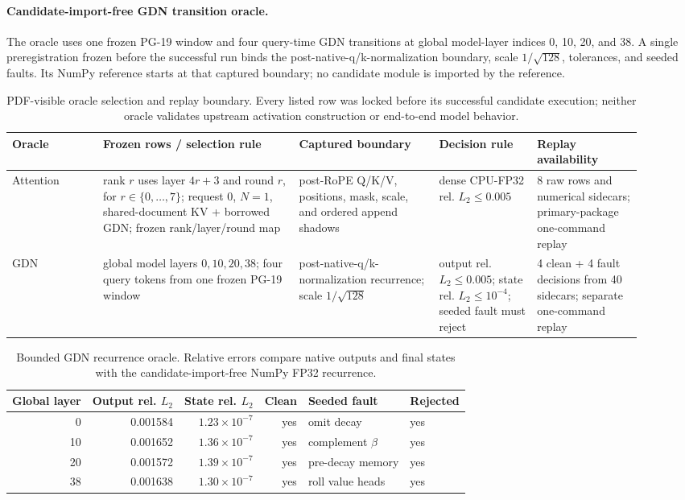 \documentclass{article}
\begin{document}
\paragraph{Candidate-import-free GDN transition oracle.}
The oracle uses one frozen PG-19 window and four query-time GDN transitions at
global model-layer indices 0, 10, 20, and 38.  A single preregistration frozen
before the successful run binds the post-native-q/k-normalization boundary,
scale $1/\sqrt{128}$, tolerances, and seeded faults.  Its NumPy reference
starts at that captured boundary; no candidate module is imported by the
reference.

\begin{table}[H]
\caption{PDF-visible oracle selection and replay boundary.  Every listed row
was locked before its successful candidate execution; neither oracle validates
upstream activation construction or end-to-end model behavior.}
\label{tab:oracle-selection}
\centering\scriptsize
\setlength{\tabcolsep}{3pt}
\begin{tabular}{@{}p{0.13\linewidth}p{0.29\linewidth}p{0.20\linewidth}p{0.14\linewidth}p{0.15\linewidth}@{}}
\toprule
Oracle & Frozen rows / selection rule & Captured boundary & Decision rule & Replay availability \\
\midrule
Attention & rank $r$ uses layer $4r+3$ and round $r$, for
$r\in\{0,\ldots,7\}$; request 0, $N=1$, shared-document KV + borrowed GDN;
frozen rank/layer/round map
& post-RoPE Q/K/V, positions, mask, scale, and ordered append shadows
& dense CPU-FP32 rel. $L_2\leq0.005$
& 8 raw rows and numerical sidecars; primary-package one-command replay \\
GDN & global model layers $0,10,20,38$; four query tokens from one frozen PG-19 window
& post-native-q/k-normalization recurrence; scale $1/\sqrt{128}$
& output rel. $L_2\leq0.005$; state rel. $L_2\leq10^{-4}$; seeded fault must reject
& 4 clean + 4 fault decisions from 40 sidecars; separate one-command replay \\
\bottomrule
\end{tabular}
\end{table}

\begin{table}[H]
\caption{Bounded GDN recurrence oracle.  Relative errors compare native outputs
and final states with the candidate-import-free NumPy FP32 recurrence.}
\label{tab:gdn-oracle}
\centering\small
\begin{tabular}{@{}rrrrll@{}}
\toprule
Global layer & Output rel. $L_2$ & State rel. $L_2$ & Clean & Seeded fault & Rejected \\
\midrule
0  & 0.001584 & $1.23\times10^{-7}$ & yes & omit decay & yes \\
10 & 0.001652 & $1.36\times10^{-7}$ & yes & complement $\beta$ & yes \\
20 & 0.001572 & $1.39\times10^{-7}$ & yes & pre-decay memory & yes \\
38 & 0.001638 & $1.30\times10^{-7}$ & yes & roll value heads & yes \\
\bottomrule
\end{tabular}
\end{table}
\end{document}
